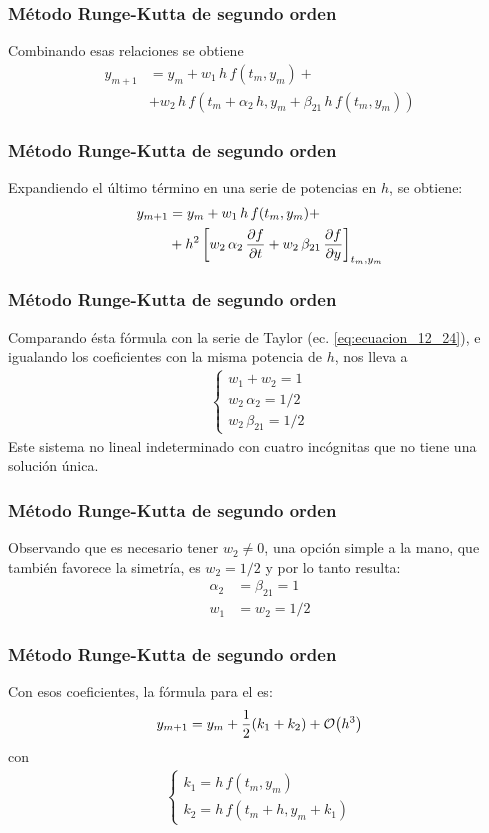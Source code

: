 \begin{frame}
\frametitle{Método Runge-Kutta de segundo orden}
Combinando esas relaciones se obtiene
\begin{align*}
y_{m+1} &= y_{m} +  w_{1} \, h \, f(t_{m}, y_{m}) + \\
&+ w_{2} \, h \, f(t_{m} + \alpha_{2} \, h, y_{m} + \beta_{21} \, h \, f(t_{m}, y_{m}))
\end{align*}
\end{frame}
\begin{frame}
\frametitle{Método Runge-Kutta de segundo orden}
Expandiendo el último término en una serie de potencias en $h$, se obtiene:
\begin{align}
\begin{aligned}
y_{m+1} &= y_{m} +  w_{1} \, h \, f(t_{m}, y_{m}) + \\
&+ h^{2} \left[ w_{2} \, \alpha_{2} \, \pdv{f}{t} + w_{2} \, \beta_{21} \, \pdv{f}{y} \right]_{t_{m}, y_{m}}
\end{aligned}
\label{eq:ecuacion_12_30}
\end{align}
\end{frame}
\begin{frame}
\frametitle{Método Runge-Kutta de segundo orden}
Comparando ésta fórmula con la serie de Taylor (ec. \ref{eq:ecuacion_12_24}), e igualando los coeficientes con la misma potencia de $h$, nos lleva a
\begin{align*}
\begin{cases}
w_{1} + w_{2} = 1 \\[0.5em]
w_{2} \, \alpha_{2} = 1/2 \\[0.5em]
w_{2} \, \beta_{21} = 1/2
\end{cases}
\end{align*}
\pause
Este sistema no lineal indeterminado con cuatro incógnitas que no tiene una solución única.
\end{frame}
\begin{frame}
\frametitle{Método Runge-Kutta de segundo orden}
Observando que es necesario tener $w_{2} \neq 0$, una opción simple a la mano, que también favorece la simetría, es $w_{2} = 1/2$ y por lo tanto resulta:
\begin{align*}
\alpha_{2} &= \beta_{21} =  1 \\[0.5em]
w_{1} &= w_{2} = 1/2
\end{align*}
\end{frame}
\begin{frame}
\frametitle{Método Runge-Kutta de segundo orden}
Con esos coeficientes, la fórmula para el  es:
\begin{align}
y_{m+1} = y_{m} + \dfrac{1}{2} (k_{1} + k_{2}) + \order{h^{3}}
\label{eq:ecuacion_12_31}
\end{align}
con
\begin{align}
\begin{cases}
k_{1} = h \, f(t_{m}, y_{m}) \\[0.5em]
k_{2} = h \, f(t_{m} + h, y_{m} + k_{1})
\end{cases}
\label{eq:ecuacion_12_32}
\end{align}
\end{frame}

